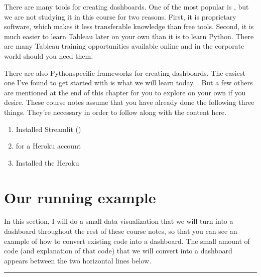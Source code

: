 \documentclass[letterpaper,10pt,english]{jupyterBook}
\begin{document}
\sphinxAtStartPar
There are many tools for creating dashboards.  One of the most popular is , but we are not studying it in this course for two reasons.  First, it is proprietary software, which makes it less transferable knowledge than free tools.  Second, it is much easier to learn Tableau later on your own than it is to learn Python.  There are many Tableau training opportunities available online and in the corporate world should you need them.

\sphinxAtStartPar
There are also Python\sphinxhyphen{}specific frameworks for creating dashboards.  The easiest one I’ve found to get started with is what we will learn today, .  But a few others are mentioned at the end of this chapter for you to explore on your own if you desire.  These course notes assume that you have already done the following three things.  They’re necessary in order to follow along with the content here.
\begin{enumerate}
%
\item {} 
\sphinxAtStartPar
Installed Streamlit ()

\item {} 
\sphinxAtStartPar
{} for a Heroku account

\item {} 
\sphinxAtStartPar
Installed the Heroku 

\end{enumerate}


\section{Our running example}
\label{\detokenize{chapter-14-dashboards:our-running-example}}
\sphinxAtStartPar
In this section, I will do a small data visualization that we will turn into a dashboard throughout the rest of these course notes, so that you can see an example of how to convert existing code into a dashboard.  The small amount of code (and explanation of that code) that we will convert into a dashboard appears between the two horizontal lines below.


\bigskip\hrule\bigskip
\end{document}
